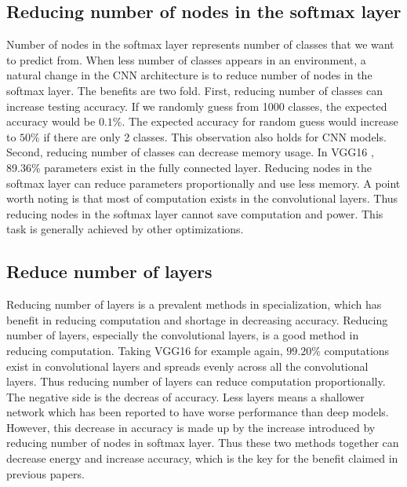 \documentclass[conference]{IEEEtran}
\begin{document}
\begin{spacing}{0.9}
\subsection{Reducing number of nodes in the softmax layer}
Number of nodes in the softmax layer represents number of classes that we want to predict from. When less number of classes appears in an environment, a natural change in the CNN architecture is to reduce number of nodes in the softmax layer. The benefits are two fold. First, reducing number of classes can increase testing accuracy. If we randomly guess from 1000 classes, the expected accuracy would be $0.1\%$. The expected accuracy for random guess would increase to $50\%$ if there are only 2 classes. This observation also holds for CNN models. Second, reducing number of classes can decrease memory usage. In VGG16 \cite{simonyan2014very}, 89.36\% parameters exist in the fully connected layer. Reducing nodes in the softmax layer can reduce parameters proportionally and use less memory. A point worth noting is that most of computation exists in the convolutional layers. Thus reducing nodes in the softmax layer cannot save computation and power. This task is generally achieved by other optimizations.

\subsection{Reduce number of layers}
Reducing number of layers is a prevalent methods in specialization, which has benefit in reducing computation and shortage in decreasing accuracy. Reducing number of layers, especially the convolutional layers, is a good method in reducing computation. Taking VGG16 for example again, $99.20\%$ computations exist in convolutional layers and spreads evenly across all the convolutional layers. Thus reducing number of layers can reduce computation proportionally. The negative side is the decreas of accuracy. Less layers means a shallower network which has been reported \cite{han2016mcdnn, shen2017fast} to have worse performance than deep models. However, this decrease in accuracy is made up by the increase introduced by reducing number of nodes in softmax layer. Thus these two methods together can decrease energy and increase accuracy, which is the key for the benefit claimed in previous papers.



\end{spacing}
\end{document}

